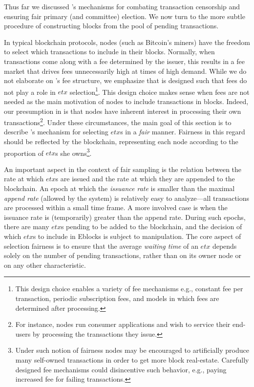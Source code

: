 Thus far we discussed \nameNS's mechanisms for combating transaction censorship and ensuring fair primary (and committee) election. We now turn to the more subtle procedure of constructing blocks from the pool of pending transactions.

In typical blockchain protocols, nodes (such as Bitcoin's miners) have the freedom to select which transactions to include in their blocks. Normally, when transactions come along with a fee determined by the issuer, this results in a fee market that drives fees unnecessarily high at times of high demand. While we do not elaborate on \nameNS's fee structure, we emphasize that \name is designed such that fees do not play a role in $etx$ selection\footnote{This design choice enables a variety of fee mechanisms e.g., constant fee per transaction, periodic subscription fees, and models in which fees are determined after processing.}. This design choice makes sense when fees are not needed as the main motivation of nodes to include transactions in blocks. Indeed, our presumption in \name is that nodes have inherent interest in processing their own transactions\footnote{For instance, nodes run consumer applications and wish to service their end-users by processing the transactions they issue.}. 
Under these circumstances, the main goal of this section is to describe \nameNS's mechanism for selecting $etx$s in a \emph{fair} manner. Fairness in this regard should be reflected by the blockchain, representing each node according to the proportion of $etx$s she owns\footnote{Under such notion of fairness nodes may be encouraged to artificially produce many self-owned transactions in order to get more block real-estate. Carefully designed fee mechanisms could disincentive such behavior, e.g., paying increased fee for failing transactions.}.

An important aspect in the context of fair sampling is the relation between the rate at which $etx$s are issued and the rate at which they are appended to the blockchain. An epoch at which the \emph{issuance rate} is smaller than the maximal \emph{append rate} (allowed by the system) is relatively easy to analyze---all transactions are processed within a small time frame. A more involved case is when the issuance rate is (temporarily) greater than the append rate. During such epochs, there are many $etx$s pending to be added to the blockchain, and the decision of which $etx$s to include in Eblocks is subject to manipulation. The core aspect of selection fairness is to ensure that the average \emph{waiting time} of an $etx$ depends solely on the number of pending transactions, rather than on its owner node or on any other characteristic.   

